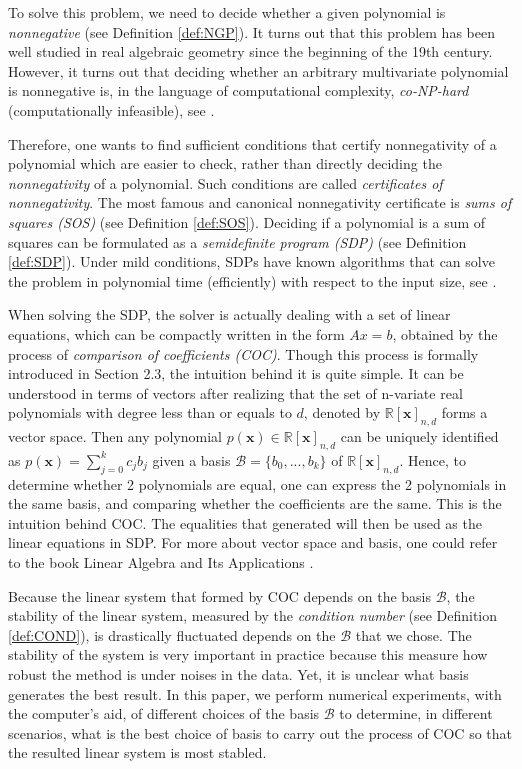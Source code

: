 \documentclass[12pt]{amsart}
\numberwithin{equation}{section}
\theoremstyle{definition}
\numberwithin{thm}{section}
\begin{document}
To solve this problem, we need to decide whether a given polynomial is \emph{nonnegative} (see Definition \ref{def:NGP}).
It turns out that this problem has been well studied in real algebraic geometry since the beginning of the 19th century. 
However, it turns out that deciding whether an arbitrary multivariate polynomial is nonnegative is,
in the language of computational complexity, \emph{co-NP-hard} (computationally infeasible), see \cite[Chapter 3]{Blekherman:Parrilo:Thomas}.

Therefore, one wants to find sufficient conditions that certify nonnegativity of a polynomial which are easier to check, 
rather than directly deciding the \emph{nonnegativity} of a polynomial. 
Such conditions are called \emph{certificates of nonnegativity}.
The most famous and canonical nonnegativity certificate is \emph{sums of squares (SOS)} (see Definition \ref{def:SOS}).
Deciding if a polynomial is a sum of squares can be formulated as a \emph{semidefinite program (SDP)} (see Definition \ref{def:SDP}).
Under mild conditions, SDPs have known algorithms that can solve the problem in polynomial time (efficiently) with respect to the input size, see \cite[Chapter~2]{Blekherman:Parrilo:Thomas}.

When solving the SDP, the solver is actually dealing with a set of linear equations, which can be compactly written in the form $Ax = b$, obtained by the process of \emph{comparison of coefficients (COC)}.
Though this process is formally introduced in Section 2.3, the intuition behind it is quite simple. 
It can be understood in terms of vectors after realizing that the set of n-variate real polynomials with degree less than or equals to $d$, denoted by $\mathbb{R}[\mathbf{x}]_{n, d}$ forms a vector space.
Then any polynomial $p(\mathbf{x}) \in \mathbb{R}[\mathbf{x}]_{n, d}$ can be uniquely identified as $p(\mathbf{x}) = \sum_{j = 0}^k c_j b_j$ given a basis $\mathcal{B} = \{b_0, ..., b_k\}$ of $\mathbb{R}[\mathbf{x}]_{n, d}$.
Hence, to determine whether 2 polynomials are equal, one can express the 2 polynomials in the same basis, 
and comparing whether the coefficients are the same. This is the intuition behind COC. 
The equalities that generated will then be used as the linear equations in SDP.
For more about vector space and basis, one could refer to the book Linear Algebra and Its Applications \cite{Lay_David2014-12-24}.

Because the linear system that formed by COC depends on the basis $\mathcal{B}$,
the stability of the linear system, measured by the \emph{condition number} (see Definition \ref{def:COND}), 
is drastically fluctuated depends on the $\mathcal{B}$ that we chose. 
The stability of the system is very important in practice because this measure how robust the method is under noises in the data.
Yet, it is unclear what basis generates the best result.
In this paper, we perform numerical experiments, with the computer's aid, of different choices of the basis $\mathcal{B}$ to determine, 
in different scenarios, what is the best choice of basis to carry out the process of COC so that the resulted linear system is most stabled. 
\end{document}
